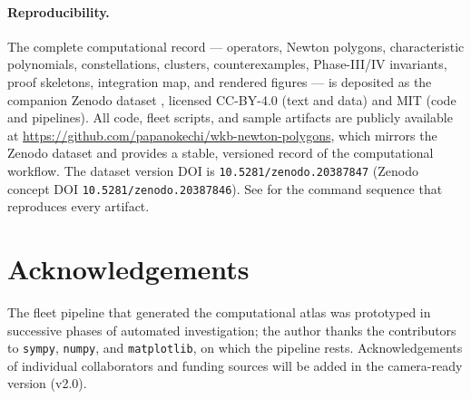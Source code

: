 \documentclass[11pt,a4paper]{article}
\theoremstyle{plain}
\theoremstyle{definition}
\theoremstyle{remark}
\begin{document}
\paragraph{Reproducibility.}
The complete computational record --- operators, Newton polygons,
characteristic polynomials, constellations, clusters, counterexamples,
Phase-III/IV invariants, proof skeletons, integration map, and
rendered figures --- is deposited as the companion Zenodo dataset
\cite{wkb_dataset_v1}, licensed CC-BY-4.0 (text and data) and MIT
(code and pipelines).
All code, fleet scripts, and sample artifacts are publicly available
at \url{https://github.com/papanokechi/wkb-newton-polygons}, which
mirrors the Zenodo dataset and provides a stable, versioned record of
the computational workflow.
The dataset version DOI is \texttt{10.5281/zenodo.20387847}
(Zenodo concept DOI \texttt{10.5281/zenodo.20387846}). See
 for the command sequence that reproduces
every artifact.


\section*{Acknowledgements}\label{sec:ack}

The fleet pipeline that generated the computational atlas was prototyped
in successive phases of automated investigation; the author thanks the
contributors to \texttt{sympy}, \texttt{numpy}, and \texttt{matplotlib},
on which the pipeline rests. Acknowledgements of individual collaborators
and funding sources will be added in the camera-ready version (v2.0).




\end{document}
